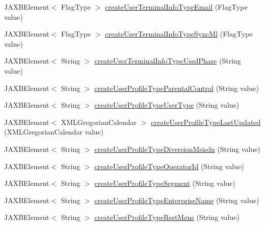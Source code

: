 \begin{DoxyCompactItemize}
JAXBElement$<$ FlagType $>$ \hyperlink{classcom_1_1telefonica_1_1schemas_1_1unica_1_1rest_1_1directory_1_1v1_1_1ObjectFactory_aa364b3a3243dcbd750e442d3cfc0a292}{createUserTerminalInfoTypeEmail} (FlagType value)
\item 
JAXBElement$<$ FlagType $>$ \hyperlink{classcom_1_1telefonica_1_1schemas_1_1unica_1_1rest_1_1directory_1_1v1_1_1ObjectFactory_a4c72f13ac498fd9fedd897a158fce500}{createUserTerminalInfoTypeSyncMl} (FlagType value)
\item 
JAXBElement$<$ String $>$ \hyperlink{classcom_1_1telefonica_1_1schemas_1_1unica_1_1rest_1_1directory_1_1v1_1_1ObjectFactory_a08e0c1ec389e6217786befcf805fdc62}{createUserTerminalInfoTypeUssdPhase} (String value)
\item 
JAXBElement$<$ String $>$ \hyperlink{classcom_1_1telefonica_1_1schemas_1_1unica_1_1rest_1_1directory_1_1v1_1_1ObjectFactory_aeaa9c7ef5f595b90f0be20a497e10574}{createUserProfileTypeParentalControl} (String value)
\item 
JAXBElement$<$ String $>$ \hyperlink{classcom_1_1telefonica_1_1schemas_1_1unica_1_1rest_1_1directory_1_1v1_1_1ObjectFactory_a825234b30b48c2d2c96f3233705c4fff}{createUserProfileTypeUserType} (String value)
\item 
JAXBElement$<$ XMLGregorianCalendar $>$ \hyperlink{classcom_1_1telefonica_1_1schemas_1_1unica_1_1rest_1_1directory_1_1v1_1_1ObjectFactory_a9ac38302e06e97a1c0a744d6b02f7f3a}{createUserProfileTypeLastUpdated} (XMLGregorianCalendar value)
\item 
JAXBElement$<$ String $>$ \hyperlink{classcom_1_1telefonica_1_1schemas_1_1unica_1_1rest_1_1directory_1_1v1_1_1ObjectFactory_ac68474baaf2a680cf3fa19547962d39b}{createUserProfileTypeDiversionMsisdn} (String value)
\item 
JAXBElement$<$ String $>$ \hyperlink{classcom_1_1telefonica_1_1schemas_1_1unica_1_1rest_1_1directory_1_1v1_1_1ObjectFactory_a02078f32da732722db924c54e0d02ef1}{createUserProfileTypeOperatorId} (String value)
\item 
JAXBElement$<$ String $>$ \hyperlink{classcom_1_1telefonica_1_1schemas_1_1unica_1_1rest_1_1directory_1_1v1_1_1ObjectFactory_af52fde80b98514bec6586309f606b195}{createUserProfileTypeSegment} (String value)
\item 
JAXBElement$<$ String $>$ \hyperlink{classcom_1_1telefonica_1_1schemas_1_1unica_1_1rest_1_1directory_1_1v1_1_1ObjectFactory_a0fd91bce374e67a0a0eced6fe15fc76b}{createUserProfileTypeEnterpriseName} (String value)
\item 
JAXBElement$<$ String $>$ \hyperlink{classcom_1_1telefonica_1_1schemas_1_1unica_1_1rest_1_1directory_1_1v1_1_1ObjectFactory_a3a9c1521aed6c3054fc16aac856061f2}{createUserProfileTypeRestMens} (String value)

\end{DoxyCompactItemize}
